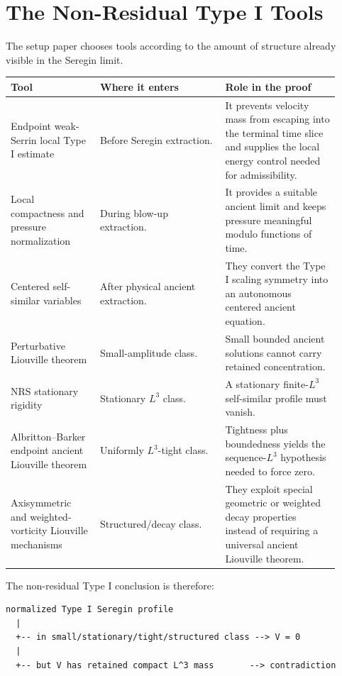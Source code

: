 \documentclass[11pt]{amsart}
\begin{document}
\section{The Non-Residual Type I Tools}

The setup paper chooses tools according to the amount of structure already visible in the Seregin limit.

\begin{longtable}{@{}>{\raggedright\arraybackslash}p{0.25\linewidth}>{\raggedright\arraybackslash}p{0.35\linewidth}>{\raggedright\arraybackslash}p{0.32\linewidth}@{}}
\toprule
\textbf{Tool} & \textbf{Where it enters} & \textbf{Role in the proof} \\
\midrule
\endhead
Endpoint weak-Serrin local Type I estimate & Before Seregin extraction. & It prevents velocity mass from escaping into the terminal time slice and supplies the local energy control needed for admissibility. \\
Local compactness and pressure normalization & During blow-up extraction. & It provides a suitable ancient limit and keeps pressure meaningful modulo functions of time. \\
Centered self-similar variables & After physical ancient extraction. & They convert the Type I scaling symmetry into an autonomous centered ancient equation. \\
Perturbative Liouville theorem & Small-amplitude class. & Small bounded ancient solutions cannot carry retained concentration. \\
NRS stationary rigidity & Stationary \(L^3\) class. & A stationary finite-\(L^3\) self-similar profile must vanish. \\
Albritton--Barker endpoint ancient Liouville theorem & Uniformly \(L^3\)-tight class. & Tightness plus boundedness yields the sequence-\(L^3\) hypothesis needed to force zero. \\
Axisymmetric and weighted-vorticity Liouville mechanisms & Structured/decay class. & They exploit special geometric or weighted decay properties instead of requiring a universal ancient Liouville theorem. \\
\bottomrule
\end{longtable}

The non-residual Type I conclusion is therefore:

\begin{center}
\begin{minipage}{0.92\linewidth}
\scriptsize
\begin{verbatim}
normalized Type I Seregin profile
  |
  +-- in small/stationary/tight/structured class --> V = 0
  |
  +-- but V has retained compact L^3 mass       --> contradiction
\end{verbatim}
\end{minipage}
\end{center}
\end{document}

